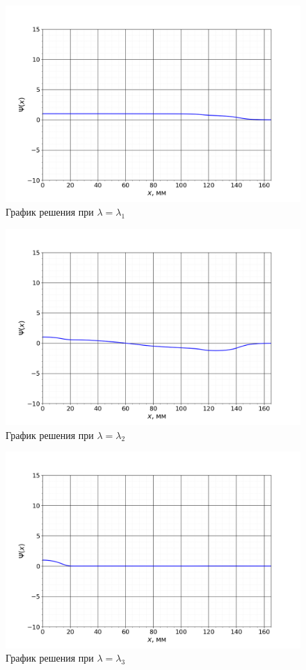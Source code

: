 		\begin{figure}[h!]
			\centering
			\includegraphics[width=0.92\linewidth]{Pictures/Scaled/1_Scaled.png}
			\caption{График решения при $\lambda = \lambda_1$}
		\end{figure}
		

		\begin{figure}[h!]
			\centering
			\includegraphics[width=0.92\linewidth]{Pictures/Scaled/2_Scaled.png}
			\caption{График решения при $\lambda = \lambda_2$}
		\end{figure}
		
		
		\newpage			
		\begin{figure}[h!]
			\centering
			\includegraphics[width=0.92\linewidth]{Pictures/Scaled/3_Scaled.png}
			\caption{График решения при $\lambda = \lambda_3$}
		\end{figure}
		
